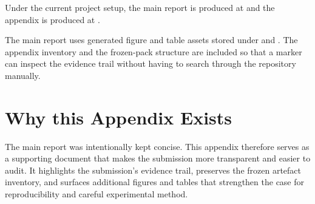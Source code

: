 \documentclass[11pt,a4paper]{report}
\begin{document}
Under the current project setup, the main report is produced at
 and the appendix is produced at
.

The main report uses generated figure and table assets stored under
 and
.
The appendix inventory and the frozen-pack structure are included so that a marker can inspect
the evidence trail without having to search through the repository manually.

\chapter{Why this Appendix Exists}

The main report was intentionally kept concise. This appendix therefore serves as a supporting
document that makes the submission more transparent and easier to audit. It highlights the
submission's evidence trail, preserves the frozen artefact inventory, and surfaces additional
figures and tables that strengthen the case for reproducibility and careful experimental method.
\end{document}
